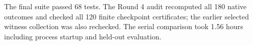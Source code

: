 The final suite passed 68 tests. The Round 4 audit recomputed all 180 native outcomes and checked all 120 finite checkpoint certificates; the earlier selected witness collection was also rechecked. The serial comparison took 1.56 hours including process startup and held-out evaluation.
